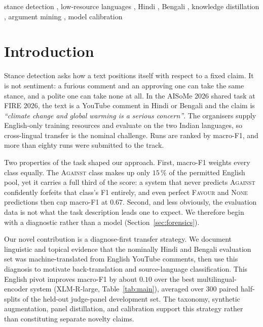 \documentclass{ceurart}
\begin{document}
\begin{keywords}
  stance detection \sep
  low-resource languages \sep
  Hindi \sep
  Bengali \sep
  knowledge distillation \sep
  argument mining \sep
  model calibration
\end{keywords}

\maketitle

\section{Introduction}

Stance detection asks how a text positions itself with respect to a fixed
claim. It is not sentiment: a furious comment and an approving one can take
the same stance, and a polite one can take none at all. In the AISoMe 2026
shared task at FIRE 2026, the text is a YouTube comment in Hindi or Bengali
and the claim is \emph{``climate change and global warming is a serious
concern''}. The organisers supply English-only training resources and
evaluate on the two Indian languages, so cross-lingual transfer is the
nominal challenge. Runs are ranked by macro-F1, and more than eighty runs
were submitted to the track.

Two properties of the task shaped our approach. First, macro-F1 weights
every class equally. The \textsc{Against} class makes up only $15\,\%$ of
the permitted English pool, yet it carries a full third of the score: a
system that never predicts \textsc{Against} confidently forfeits that
class's F1 entirely, and even perfect \textsc{Favour} and \textsc{None}
predictions then cap macro-F1 at $0.67$. Second, and less obviously, the
evaluation data is not what the task description leads one to expect. We
therefore begin with a diagnostic rather than a model
(Section~\ref{sec:forensics}).

Our novel contribution is a diagnose-first transfer strategy. We document
linguistic and topical evidence that the nominally Hindi and Bengali
evaluation set was machine-translated from English YouTube comments, then
use this diagnosis to motivate back-translation and source-language
classification. This English pivot
improves macro-F1 by about $0.10$ over the best multilingual-encoder system
(XLM-R-large, Table~\ref{tab:main}), averaged over 300 paired half-splits of
the held-out judge-panel development set. The taxonomy, synthetic augmentation,
panel distillation, and calibration support this strategy rather than
constituting separate novelty claims.
\end{document}
